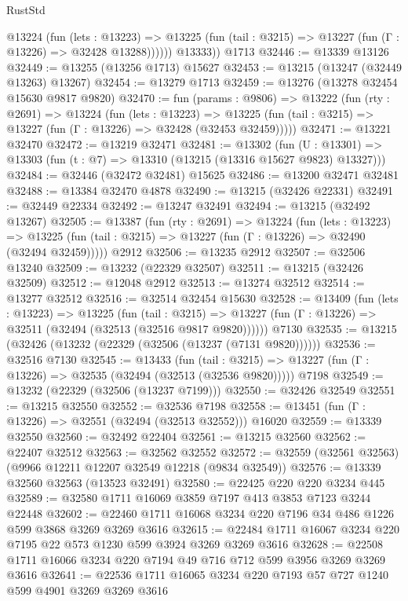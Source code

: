\begin{lexlean}{RustStd}
\begin{coremodule}
            @13224
              (fun (lets : @13223) =>
              @13225 (fun (tail : @3215) => @13227 (fun (Γ : @13226) => @32428 @13288))))))
        @13333))
    @1713
@32446 := @13339 @13126
@32449 := @13255 (@13256 @1713) @15627
@32453 := @13215 (@13247 (@32449 @13263) @13267)
@32454 := @13279 @1713
@32459 := @13276 (@13278 @32454 @15630 @9817 @9820)
@32470 := fun (params : @9806) =>
  @13222
    (fun (rty : @2691) =>
    @13224
      (fun (lets : @13223) =>
      @13225 (fun (tail : @3215) => @13227 (fun (Γ : @13226) => @32428 (@32453 @32459)))))
@32471 := @13221 @32470
@32472 := @13219 @32471
@32481 := @13302
    (fun (U : @13301) => @13303 (fun (t : @7) => @13310 (@13215 (@13316 @15627 @9823) @13327)))
@32484 := @32446 (@32472 @32481) @15625
@32486 := @13200 @32471 @32481
@32488 := @13384 @32470 @4878
@32490 := @13215 (@32426 @22331)
@32491 := @32449 @22334
@32492 := @13247 @32491
@32494 := @13215 (@32492 @13267)
@32505 := @13387
    (fun (rty : @2691) =>
    @13224
      (fun (lets : @13223) =>
      @13225 (fun (tail : @3215) => @13227 (fun (Γ : @13226) => @32490 (@32494 @32459)))))
    @2912
@32506 := @13235 @2912
@32507 := @32506 @13240
@32509 := @13232 (@22329 @32507)
@32511 := @13215 (@32426 @32509)
@32512 := @12048 @2912
@32513 := @13274 @32512
@32514 := @13277 @32512
@32516 := @32514 @32454 @15630
@32528 := @13409
    (fun (lets : @13223) =>
    @13225
      (fun (tail : @3215) =>
      @13227 (fun (Γ : @13226) => @32511 (@32494 (@32513 (@32516 @9817 @9820))))))
    @7130
@32535 := @13215 (@32426 (@13232 (@22329 (@32506 (@13237 (@7131 @9820))))))
@32536 := @32516 @7130
@32545 := @13433
    (fun (tail : @3215) => @13227 (fun (Γ : @13226) => @32535 (@32494 (@32513 (@32536 @9820)))))
    @7198
@32549 := @13232 (@22329 (@32506 (@13237 @7199)))
@32550 := @32426 @32549
@32551 := @13215 @32550
@32552 := @32536 @7198
@32558 := @13451 (fun (Γ : @13226) => @32551 (@32494 (@32513 @32552))) @16020
@32559 := @13339 @32550
@32560 := @32492 @22404
@32561 := @13215 @32560
@32562 := @22407 @32512
@32563 := @32562 @32552
@32572 := @32559 (@32561 @32563) (@9966 @12211 @12207 @32549 @12218 (@9834 @32549))
@32576 := @13339 @32560 @32563 (@13523 @32491)
@32580 := @22425 @220 @220 @3234 @445
@32589 := @32580 @1711 @16069 @3859 @7197 @413 @3853 @7123 @3244 @22448
@32602 := @22460 @1711 @16068 @3234 @220 @7196 @34 @486 @1226 @599 @3868 @3269 @3269 @3616
@32615 := @22484 @1711 @16067 @3234 @220 @7195 @22 @573 @1230 @599 @3924 @3269 @3269 @3616
@32628 := @22508 @1711 @16066 @3234 @220 @7194 @49 @716 @712 @599 @3956 @3269 @3269 @3616
@32641 := @22536 @1711 @16065 @3234 @220 @7193 @57 @727 @1240 @599 @4901 @3269 @3269 @3616

\end{coremodule}
\end{lexlean}
